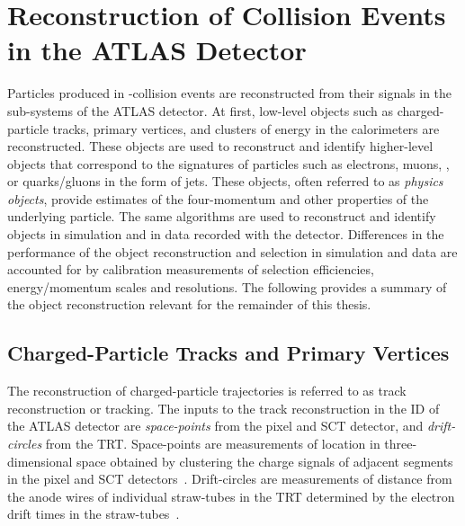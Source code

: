 \section{Reconstruction of Collision Events in the ATLAS Detector}%
\label{sec:object_reco_at_atlas}

Particles produced in \pp-collision events are reconstructed from their signals
in the sub-systems of the ATLAS detector. At first, low-level objects such as
charged-particle tracks, primary vertices, and clusters of energy in the
calorimeters are reconstructed. These objects are used to reconstruct and
identify higher-level objects that correspond to the signatures of particles
such as electrons, muons, \tauleptons, or quarks/gluons in the form of jets.
These objects, often referred to as \emph{physics objects}, provide estimates of
the four-momentum and other properties of the underlying particle. The same
algorithms are used to reconstruct and identify objects in simulation and in
data recorded with the detector. Differences in the performance of the object
reconstruction and selection in simulation and data are accounted for by
calibration measurements of selection efficiencies, energy/momentum scales and
resolutions. The following provides a summary of the object reconstruction
relevant for the remainder of this thesis.


\subsection{Charged-Particle Tracks and Primary Vertices}

The reconstruction of charged-particle trajectories is referred to as track
reconstruction or tracking. The inputs to the track reconstruction in the ID of
the ATLAS detector are \emph{space-points} from the pixel and SCT detector, and
\emph{drift-circles} from the TRT. Space-points are measurements of location in
three-dimensional space obtained by clustering the charge signals of adjacent
segments in the pixel and SCT detectors~\cite{PERF-2015-08}. Drift-circles are
measurements of distance from the anode wires of individual straw-tubes in the
TRT determined by the electron drift times in the
straw-tubes~\cite{IDET-2015-01}.

